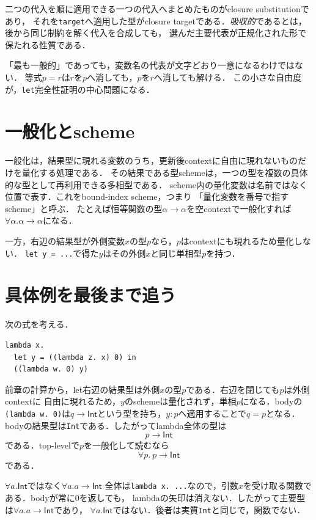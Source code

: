 \documentclass[11pt,a4paper,oneside]{ltjsbook}
\newcommand{\code}[1]{\texttt{#1}}
\newcommand{\TyInt}{\mathsf{Int}}
\newcommand{\fn}{\mathbin{\to}}
\begin{document}
二つの代入を順に適用できる一つの代入へまとめたものがclosure substitutionであり，
それを\code{target}へ適用した型がclosure targetである．\emph{吸収的}であるとは，
後から同じ制約を解く代入を合成しても，
選んだ主要代表が正規化された形で保たれる性質である．

「最も一般的」であっても，変数名の代表が文字どおり一意になるわけではない．
等式$p=r$は$r$を$p$へ消しても，$p$を$r$へ消しても解ける．
この小さな自由度が，\code{let}完全性証明の中心問題になる．

\section{一般化とscheme}

一般化は，結果型に現れる変数のうち，更新後contextに自由に現れないものだけを量化する処理である．
その結果である型schemeは，一つの型を複数の具体的な型として再利用できる多相型である．
scheme内の量化変数は名前ではなく位置で表す．これをbound-index scheme，つまり
「量化変数を番号で指すscheme」と呼ぶ．
たとえば恒等関数の型$\alpha\fn\alpha$を空contextで一般化すれば
$\forall\alpha.\alpha\fn\alpha$になる．

一方，右辺の結果型が外側変数$x$の型$p$なら，$p$はcontextにも現れるため量化しない．
\code{let y = ...}で得た$y$はその外側$x$と同じ単相型$p$を持つ．

\section{具体例を最後まで追う}

次の式を考える．

\begin{lstlisting}
lambda x.
  let y = ((lambda z. x) 0) in
  ((lambda w. 0) y)
\end{lstlisting}

前章の計算から，let右辺の結果型は外側$x$の型$p$である．右辺を閉じても$p$は外側contextに
自由に現れるため，$y$のschemeは量化されず，単相$p$になる．bodyの
\code{(lambda w. 0)}は$q\fn\TyInt$という型を持ち，$y:p$へ適用することで$q=p$となる．
bodyの結果型は\code{Int}である．したがってlambda全体の型は
\[
  p\fn\TyInt
\]
である．top-levelで$p$を一般化して読むなら
\[
  \forall p.\ p\fn\TyInt
\]
である．

\begin{warningbox}{\(\forall a.\TyInt\)ではなく\(\forall a.a\fn\TyInt\)}
全体は\code{lambda x. ...}なので，引数$x$を受け取る関数である．bodyが常に0を返しても，
lambdaの矢印は消えない．したがって主要型は$\forall a.a\fn\TyInt$であり，
$\forall a.\TyInt$ではない．後者は実質\code{Int}と同じで，関数でない．
\end{warningbox}
\end{document}
